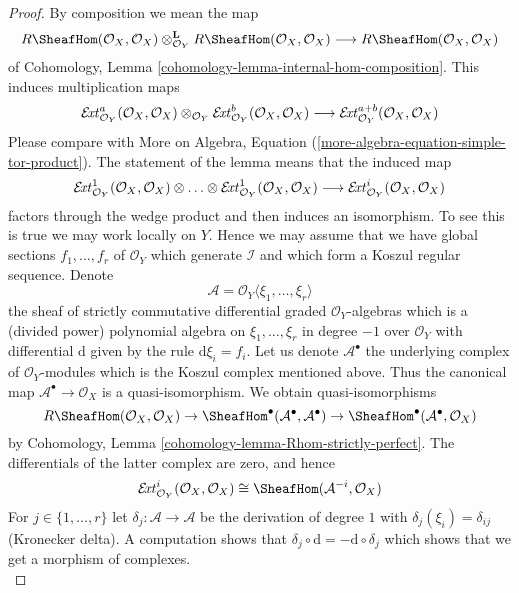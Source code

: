 \begin{proof}
By composition we mean the map
$$
R\SheafHom(\mathcal{O}_X, \mathcal{O}_X)
\otimes_{\mathcal{O}_Y}^\mathbf{L}
R\SheafHom(\mathcal{O}_X, \mathcal{O}_X)
\longrightarrow
R\SheafHom(\mathcal{O}_X, \mathcal{O}_X)
$$
of Cohomology, Lemma \ref{cohomology-lemma-internal-hom-composition}.
This induces multiplication maps
$$
\mathcal{E}\!{\it xt}^a_{\mathcal{O}_Y}(\mathcal{O}_X, \mathcal{O}_X)
\otimes_{\mathcal{O}_Y}
\mathcal{E}\!{\it xt}^b_{\mathcal{O}_Y}(\mathcal{O}_X, \mathcal{O}_X)
\longrightarrow
\mathcal{E}\!{\it xt}^{a + b}_{\mathcal{O}_Y}(\mathcal{O}_X, \mathcal{O}_X)
$$
Please compare with
More on Algebra, Equation (\ref{more-algebra-equation-simple-tor-product}).
The statement of the lemma means that the induced map
$$
\mathcal{E}\!{\it xt}^1_{\mathcal{O}_Y}(\mathcal{O}_X, \mathcal{O}_X)
\otimes \ldots \otimes
\mathcal{E}\!{\it xt}^1_{\mathcal{O}_Y}(\mathcal{O}_X, \mathcal{O}_X)
\longrightarrow
\mathcal{E}\!{\it xt}^i_{\mathcal{O}_Y}(\mathcal{O}_X, \mathcal{O}_X)
$$
factors through the wedge product and then induces an isomorphism.
To see this is true we may work locally on $Y$. Hence we may assume
that we have global sections $f_1, \ldots, f_r$ of $\mathcal{O}_Y$
which generate $\mathcal{I}$ and which form a Koszul regular sequence.
Denote
$$
\mathcal{A} = \mathcal{O}_Y\langle \xi_1, \ldots, \xi_r\rangle
$$
the sheaf of strictly commutative differential graded $\mathcal{O}_Y$-algebras
which is a (divided power) polynomial algebra on
$\xi_1, \ldots, \xi_r$ in degree $-1$ over $\mathcal{O}_Y$
with differential $\text{d}$ given by the rule $\text{d}\xi_i = f_i$.
Let us denote $\mathcal{A}^\bullet$ the underlying
complex of $\mathcal{O}_Y$-modules which is the Koszul complex
mentioned above. Thus the canonical map
$\mathcal{A}^\bullet \to \mathcal{O}_X$
is a quasi-isomorphism. We obtain quasi-isomorphisms
$$
R\SheafHom(\mathcal{O}_X, \mathcal{O}_X) \to
\SheafHom^\bullet(\mathcal{A}^\bullet, \mathcal{A}^\bullet) \to
\SheafHom^\bullet(\mathcal{A}^\bullet, \mathcal{O}_X)
$$
by Cohomology, Lemma \ref{cohomology-lemma-Rhom-strictly-perfect}.
The differentials of the latter complex are zero, and hence
$$
\mathcal{E}\!{\it xt}^i_{\mathcal{O}_Y}(\mathcal{O}_X, \mathcal{O}_X)
\cong \SheafHom(\mathcal{A}^{-i}, \mathcal{O}_X)
$$
For $j \in \{1, \ldots, r\}$ let $\delta_j : \mathcal{A} \to \mathcal{A}$
be the derivation of degree $1$ with $\delta_j(\xi_i) = \delta_{ij}$
(Kronecker delta). A computation shows that
$\delta_j \circ \text{d} = - \text{d} \circ \delta_j$ which shows that
we get a morphism of complexes.
$$
$$
\end{proof}
